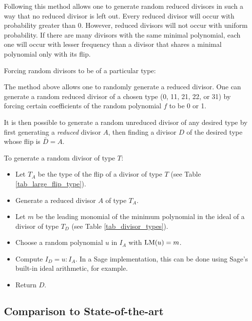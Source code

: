 Following this method allows one to generate random reduced divisors
in such a way that no reduced divisor is left out.
Every reduced divisor will occur with probability greater than 0.
However, reduced divisors will not occur with uniform probability.
If there are many divisors with the same minimal polynomial,
each one will occur with lesser frequency than a divisor that shares a minimal polynomial only with its flip.


Forcing random divisors to be of a particular type:

The method above allows one to randomly generate a reduced divisor.
One can generate a random reduced divisor of a chosen type (0, 11, 21, 22, or 31)
by forcing certain coefficients of the random polynomial $f$ to be 0 or 1.

It is then possible to generate a random unreduced divisor of any desired type
by first generating a \emph{reduced} divisor $A$, then finding a divisor $D$ of the desired type
whose flip is $\bar D = A$.

To generate a random divisor of type $T$:
\begin{itemize}
  \item
    Let $T_A$ be the type of the flip of a divisor of type $T$ (see Table \ref{tab_large_flip_type}).
  \item
    Generate a reduced divisor $A$ of type $T_A$.
  \item
    Let $m$ be the leading monomial of the minimum polynomial in the ideal of a divisor of type $T_D$
    (see Table \ref{tab_divisor_types}).
  \item
    Choose a random polynomial $u$ in $I_A$ with $\operatorname{LM}(u) = m$.
  \item
    Compute $I_D = u : I_A$.
    In a Sage implementation, this can be done using Sage's built-in ideal arithmetic, for example.
  \item
    Return $D$.
\end{itemize}




\subsection{Comparison to State-of-the-art}

